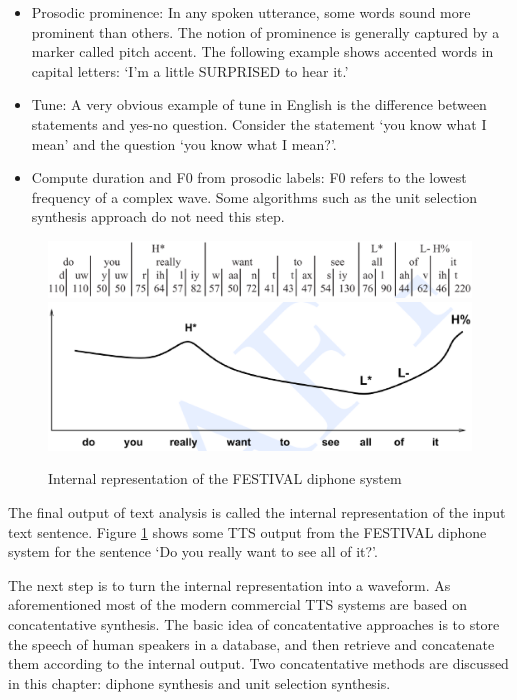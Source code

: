 \documentclass[paper=a4, fontsize=18pt]{article} %
\numberwithin{equation}{section} %
\numberwithin{figure}{section} %
\numberwithin{table}{section} %
\begin{document}
\begin{enumerate}
{\begin{itemize}
    \item Prosodic prominence: In any spoken utterance, some words sound more prominent than others. The notion of prominence is generally captured by a marker called pitch accent. The following example shows accented words in capital letters: `I'm a little SURPRISED to hear it.'
    \item Tune: A very obvious example of tune in English is the difference between statements and yes-no question. Consider the statement `you know what I mean' and the question `you know what I mean?'.
    \item Compute duration and F0 from prosodic labels: F0 refers to the lowest frequency of a complex wave. Some algorithms such as the unit selection synthesis approach do not need this step.
    \end{itemize}
}
\end{enumerate}

\begin{figure}[htbp]
  \centering
  \includegraphics[width=.7\linewidth]{10_17_tts1}\\
  \includegraphics[width=.5\linewidth]{10_17_tts2}\\
  \caption{Internal representation of the FESTIVAL diphone system}\label{fig:TTS_inter}
\end{figure}

The final output of text analysis is called the internal representation of the input text sentence. Figure \ref{fig:TTS_inter} shows some TTS output from the FESTIVAL diphone system for the sentence `Do you really want to see all of it?'.

The next step is to turn the internal representation into a waveform. As aforementioned most of the modern commercial TTS systems are based on concatentative synthesis. The basic idea of concatentative approaches is to store the speech of human speakers in a database, and then retrieve and concatenate them according to the internal output. Two concatentative methods are discussed in this chapter: diphone synthesis and unit selection synthesis.
\end{document}
